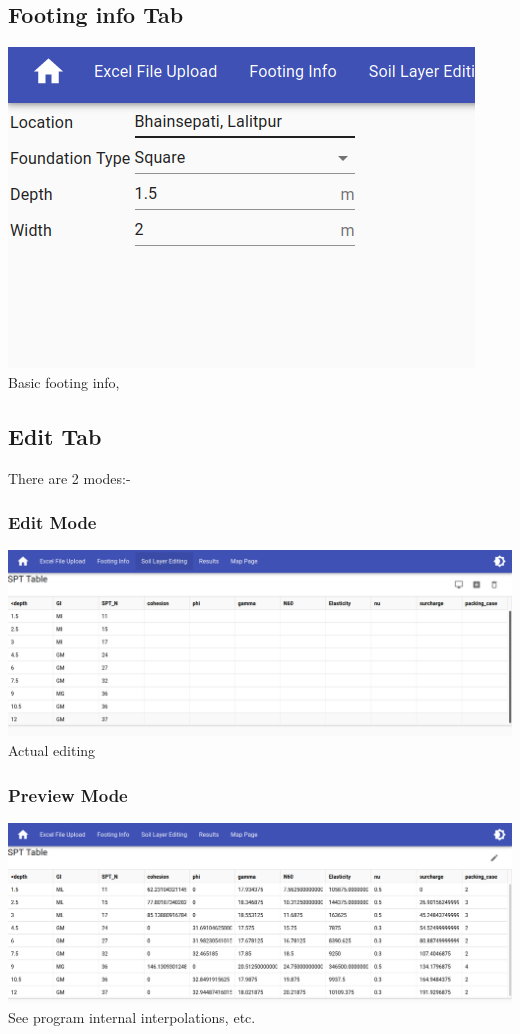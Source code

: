 \subsection{Footing info Tab}
\includegraphics[width=\linewidth,keepaspectratio]{./extras/images/footing_info.png}
Basic footing info,\\

\subsection{Edit Tab}
There are 2 modes:-\\
\subsubsection{Edit Mode}
\includegraphics[width=\linewidth,keepaspectratio]{./extras/images/edit_mode.png}
Actual editing\\

\subsubsection{Preview Mode}
\includegraphics[width=\linewidth,keepaspectratio]{./extras/images/preview_mode.png}
See program internal interpolations, etc. \\

